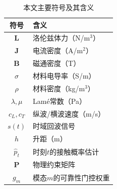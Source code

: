 \begin{table}[htbp]
\centering
\caption{本文主要符号及其含义}
\begin{tabular}{cl}
\toprule
\textbf{符号} & \textbf{含义} \\
\midrule
$\mathbf{L}$ & 洛伦兹体力（N/m$^3$）\\
$\mathbf{J}$ & 电流密度（A/m$^2$）\\
$\mathbf{B}$ & 磁通密度（T）\\
$\sigma$ & 材料电导率（S/m）\\
$\rho$ & 材料密度（kg/m$^3$）\\
$\lambda, \mu$ & Lam\'{e}常数（Pa）\\
$c_L, c_T$ & 纵波/横波速度（m/s）\\
$s(t)$ & 时域回波信号\\
$h$ & 升距（m）\\
$\hat{p}_t$ & 时刻$t$的接触概率估计\\
$\mathbf{P}$ & 物理约束矩阵\\
$g_m$ & 模态$m$的可靠性门控权重\\
\bottomrule
\end{tabular}
\end{table}